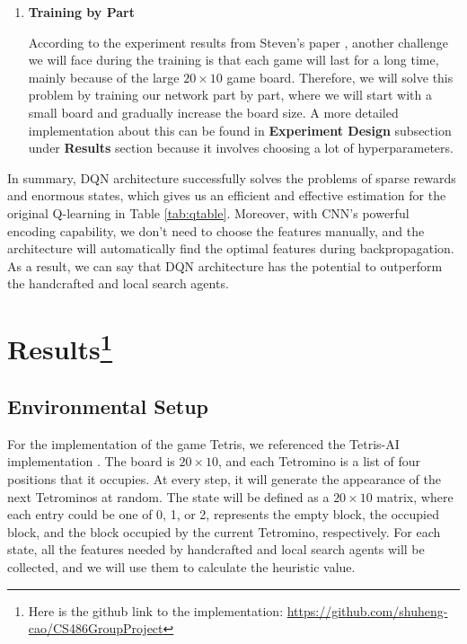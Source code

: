 \documentclass[letterpaper]{article} %
\begin{document}
\begin{enumerate}
  Note that we need a decaying $\epsilon$ because we want to explore more in the beginning, and as we approach the end of the training phase, we want to exploit more.\footnote{This gives two extra hyperparameters $\epsilon$ and $\delta$ that need to be adjusted during training.}

  \item {\bf Training by Part}

  According to the experiment results from Steven's paper \cite{Stevens_2016}, another challenge we will face during the training is that each game will last for a long time, mainly because of the large $20\times 10$ game board. Therefore, we will solve this problem by training our network part by part, where we will start with a small board and gradually increase the board size. A more detailed implementation about this can be found in \textbf{Experiment Design} subsection under \textbf{Results} section because it involves choosing a lot of hyperparameters.
  

\end{enumerate}

In summary, DQN architecture successfully solves the problems of sparse rewards and enormous states, which gives us an efficient and effective estimation for the original Q-learning in Table \ref{tab:qtable}. Moreover, with CNN's powerful encoding capability, we don't need to choose the features manually, and the architecture will automatically find the optimal features during backpropagation. As a result, we can say that DQN architecture has the potential to outperform the handcrafted and local search agents.


\section{Results\footnote{Here is the github link to the implementation: \url{https://github.com/shuheng-cao/CS486GroupProject}}}
\subsection{Environmental Setup}
For the implementation of the game Tetris, we referenced the Tetris-AI implementation \cite{Nuno}. The board is $20 \times 10$, and each Tetromino is a list of four positions that it occupies. At every step, it will generate the appearance of the next Tetrominos at random. The state will be defined as a $20 \times 10$ matrix, where each entry could be one of 0, 1, or 2, represents the empty block, the occupied block, and the block occupied by the current Tetromino, respectively. For each state, all the features needed by handcrafted and local search agents will be collected, and we will use them to calculate the heuristic value. 
\end{document}
